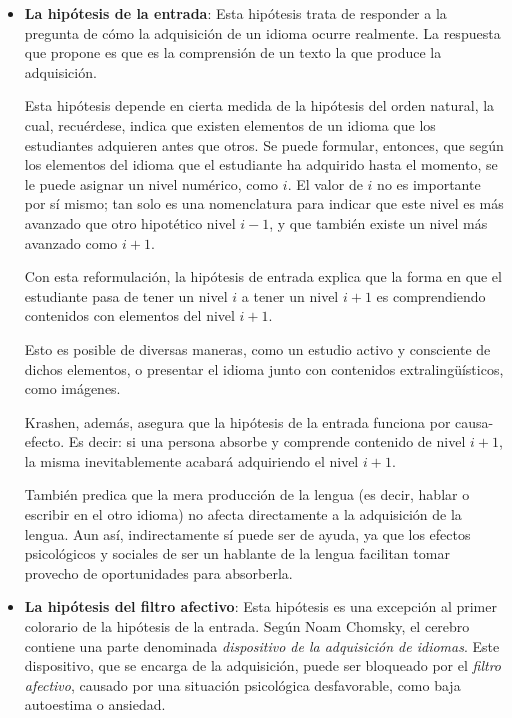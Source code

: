 \begin{itemize}
	\item \textbf{La hipótesis de la entrada}: Esta hipótesis trata de responder a la pregunta de cómo la adquisición de un idioma ocurre realmente. La respuesta que propone es que es la comprensión de un texto la que produce la adquisición.
	
	Esta hipótesis depende en cierta medida de la hipótesis del orden natural, la cual, recuérdese, indica que existen elementos de un idioma que los estudiantes adquieren antes que otros. Se puede formular, entonces, que según los elementos del idioma que el estudiante ha adquirido hasta el momento, se le puede asignar un nivel numérico, como $i$. El valor de $i$ no es importante por sí mismo; tan solo es una nomenclatura para indicar que este nivel es más avanzado que otro hipotético nivel $i - 1$, y que también existe un nivel más avanzado como $i + 1$.
	
	Con esta reformulación, la hipótesis de entrada explica que la forma en que el estudiante pasa de tener un nivel $i$ a tener un nivel $i + 1$ es comprendiendo contenidos con elementos del nivel $i + 1$.
	
	Esto es posible de diversas maneras, como un estudio activo y consciente de dichos elementos, o presentar el idioma junto con contenidos extralingüísticos, como imágenes.
	
	Krashen, además, asegura que la hipótesis de la entrada funciona por causa-efecto. Es decir: si una persona absorbe y comprende contenido de nivel $i + 1$, la misma inevitablemente acabará adquiriendo el nivel $i + 1$.
	
	También predica que la mera producción de la lengua (es decir, hablar o escribir en el otro idioma) no afecta directamente a la adquisición de la lengua. Aun así, indirectamente sí puede ser de ayuda, ya que los efectos psicológicos y sociales de ser un hablante de la lengua facilitan tomar provecho de oportunidades para absorberla.
	
	\item \textbf{La hipótesis del filtro afectivo}: Esta hipótesis es una excepción al primer colorario de la hipótesis de la entrada. Según Noam Chomsky, el cerebro contiene una parte denominada \textit{dispositivo de la adquisición de idiomas}. Este dispositivo, que se encarga de la adquisición, puede ser bloqueado por el \textit{filtro afectivo}, causado por una situación psicológica desfavorable, como baja autoestima o ansiedad. 
\end{itemize}

